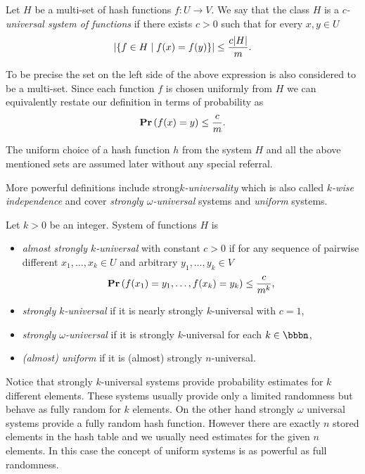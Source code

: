 \begin{definition}
\label{definition-c-universal-system}
Let $H$ be a multi-set of hash functions $f\colon U \rightarrow V$. We say that the class $H$ is a \emph{$c$-universal system of functions} if there exists $c > 0$ such that for every $x, y \in U$
\[
\left|\lbrace f \in H \mid f(x) = f(y) \rbrace\right| \leq \frac{c|H|}{m}.
\]
\end{definition}

To be precise the set on the left side of the above expression is also considered to be a multi-set. Since each function $f$ is chosen uniformly from $H$ we can equivalently restate our definition in terms of probability as
\[
\mathbf{Pr}\left(f(x) = y\right) \leq \frac{c}{m}.
\]

The uniform choice of a hash function $h$ from the system $H$ and all the above mentioned sets are assumed later without any special referral.

More powerful definitions include strong\emph{$k$-universality} which is also called \emph{$k$-wise independence} and cover \emph{strongly $\omega$-universal} systems and \emph{uniform} systems.
\begin{definition}
Let $k > 0$ be an integer. System of functions $H$ is 
\begin{itemize}
	\item \emph{almost strongly $k$-universal} with constant $c > 0$ if for any sequence of pairwise different $x_1, \dots, x_k \in U$ and arbitrary $y_1, \dots, y_k \in V$ \[\mathbf{Pr}\left(f(x_1) = y_1, \dots, f(x_k) = y_k\right) \leq \frac{c}{m^k}\mbox{,}\]
	\item \emph{strongly $k$-universal} if it is nearly strongly $k$-universal with $c = 1$,
	\item \emph{strongly $\omega$-universal} if it is strongly $k$-universal for each $k \in \bbbn$,
	\item \emph{(almost) uniform} if it is (almost) strongly $n$-universal.
\end{itemize}
\end{definition}

Notice that strongly $k$-universal systems provide probability estimates for $k$ different elements. These systems usually provide only a limited randomness but behave as fully random for $k$ elements. On the other hand strongly $\omega$ universal systems provide a fully random hash function. However there are exactly $n$ stored elements in the hash table and we usually need estimates for the given $n$ elements. In this case the concept of uniform systems is as powerful as full randomness.
